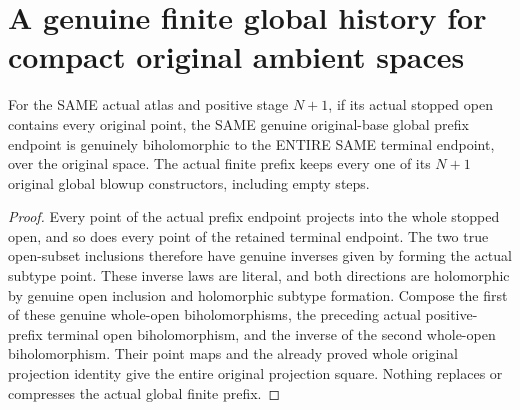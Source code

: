 \section{A genuine finite global history for compact original ambient spaces}

\begin{lemma}
\label{hir:sharp-actual-curve-whole-stopped-prefix-terminal-biholomorphism}
\leanok
For the SAME actual atlas and positive stage $N+1$, if its actual stopped
open contains every original point, the SAME genuine original-base global
prefix endpoint is genuinely biholomorphic to the ENTIRE SAME terminal
endpoint, over the original space. The actual finite prefix keeps every
one of its $N+1$ original global blowup constructors, including empty steps.
\end{lemma}
\begin{proof}
Every point of the actual prefix endpoint projects into the whole stopped
open, and so does every point of the retained terminal endpoint. The two
true open-subset inclusions therefore have genuine inverses given by
forming the actual subtype point. These inverse laws are literal, and
both directions are holomorphic by genuine open inclusion and holomorphic
subtype formation. Compose the first of these genuine whole-open
biholomorphisms, the preceding actual positive-prefix terminal open
biholomorphism, and the inverse of the second whole-open biholomorphism.
Their point maps and the already proved whole original projection identity
give the entire original projection square. Nothing replaces or compresses
the actual global finite prefix.
\end{proof}

